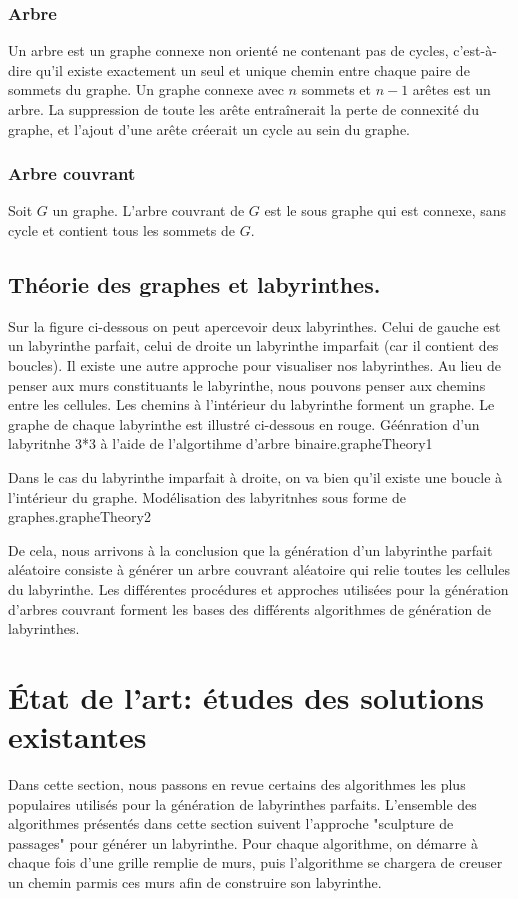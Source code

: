 \subsubsection{Arbre}
Un arbre est un graphe connexe non orienté ne contenant pas de cycles, c'est-à-dire qu'il existe exactement un seul et unique chemin entre chaque paire de sommets du graphe. Un graphe connexe avec $n$ sommets et $n-1$ arêtes est un arbre.
La suppression de toute les arête entraînerait la perte de connexité du graphe, et l'ajout d'une arête créerait un cycle au sein du graphe.

\subsubsection{Arbre couvrant}
Soit $G$ un graphe. L'arbre couvrant de $G$ est le sous graphe qui est connexe, sans cycle et contient tous les sommets de $G$.


\newpage
\subsection{Théorie des graphes et labyrinthes.}
Sur la figure ci-dessous on peut apercevoir deux labyrinthes. Celui de gauche est un labyrinthe parfait, celui de droite un labyrinthe imparfait (car il contient des boucles). Il existe une autre approche pour visualiser nos labyrinthes. Au lieu de penser aux murs constituants le labyrinthe, nous pouvons penser aux chemins entre les cellules. 
Les chemins à l'intérieur du labyrinthe forment un graphe. Le graphe de chaque labyrinthe est illustré ci-dessous en rouge. \newline
{}
{Géénration d'un labyritnhe 3*3 à l'aide de l'algortihme d'arbre binaire.}{grapheTheory1}


Dans le cas du labyrinthe imparfait à droite, on va bien qu'il existe une boucle à l'intérieur du graphe.
{Modélisation des labyritnhes sous forme de graphes.}{grapheTheory2}

De cela, nous arrivons à la conclusion que la génération d'un labyrinthe parfait aléatoire consiste à générer un arbre couvrant aléatoire qui relie toutes les cellules du labyrinthe.
Les différentes procédures et approches utilisées pour la génération d'arbres couvrant forment les bases des différents algorithmes de génération de labyrinthes. 


\section{État de l’art: études des solutions existantes}
Dans cette section, nous passons en revue certains des algorithmes les plus populaires utilisés pour la génération de labyrinthes parfaits.
L'ensemble des algorithmes présentés dans cette section suivent l'approche "sculpture de passages" pour générer un labyrinthe. Pour chaque algorithme, on démarre à chaque fois d'une grille remplie de murs, puis l'algorithme se chargera de creuser un chemin parmis ces murs afin de construire son labyrinthe. 
